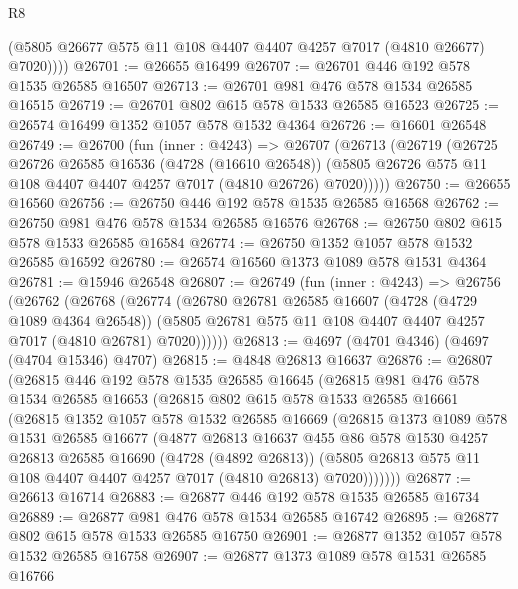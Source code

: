 \begin{lexlean}{R8}
\begin{coremodule}
          (@5805 @26677 @575 @11 @108 @4407 @4407 @4257 @7017 (@4810 @26677) @7020))))
@26701 := @26655 @16499
@26707 := @26701 @446 @192 @578 @1535 @26585 @16507
@26713 := @26701 @981 @476 @578 @1534 @26585 @16515
@26719 := @26701 @802 @615 @578 @1533 @26585 @16523
@26725 := @26574 @16499 @1352 @1057 @578 @1532 @4364
@26726 := @16601 @26548
@26749 := @26700
    (fun (inner : @4243) =>
    @26707
      (@26713
        (@26719
          (@26725
            @26726
            @26585
            @16536
            (@4728 (@16610 @26548))
            (@5805 @26726 @575 @11 @108 @4407 @4407 @4257 @7017 (@4810 @26726) @7020)))))
@26750 := @26655 @16560
@26756 := @26750 @446 @192 @578 @1535 @26585 @16568
@26762 := @26750 @981 @476 @578 @1534 @26585 @16576
@26768 := @26750 @802 @615 @578 @1533 @26585 @16584
@26774 := @26750 @1352 @1057 @578 @1532 @26585 @16592
@26780 := @26574 @16560 @1373 @1089 @578 @1531 @4364
@26781 := @15946 @26548
@26807 := @26749
    (fun (inner : @4243) =>
    @26756
      (@26762
        (@26768
          (@26774
            (@26780
              @26781
              @26585
              @16607
              (@4728 (@4729 @1089 @4364 @26548))
              (@5805 @26781 @575 @11 @108 @4407 @4407 @4257 @7017 (@4810 @26781) @7020))))))
@26813 := @4697 (@4701 @4346) (@4697 (@4704 @15346) @4707)
@26815 := @4848 @26813 @16637
@26876 := @26807
    (@26815
      @446
      @192
      @578
      @1535
      @26585
      @16645
      (@26815
        @981
        @476
        @578
        @1534
        @26585
        @16653
        (@26815
          @802
          @615
          @578
          @1533
          @26585
          @16661
          (@26815
            @1352
            @1057
            @578
            @1532
            @26585
            @16669
            (@26815
              @1373
              @1089
              @578
              @1531
              @26585
              @16677
              (@4877
                @26813
                @16637
                @455
                @86
                @578
                @1530
                @4257
                @26813
                @26585
                @16690
                (@4728 (@4892 @26813))
                (@5805 @26813 @575 @11 @108 @4407 @4407 @4257 @7017 (@4810 @26813) @7020)))))))
@26877 := @26613 @16714
@26883 := @26877 @446 @192 @578 @1535 @26585 @16734
@26889 := @26877 @981 @476 @578 @1534 @26585 @16742
@26895 := @26877 @802 @615 @578 @1533 @26585 @16750
@26901 := @26877 @1352 @1057 @578 @1532 @26585 @16758
@26907 := @26877 @1373 @1089 @578 @1531 @26585 @16766

\end{coremodule}
\end{lexlean}
